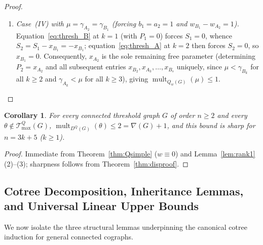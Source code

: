 \documentclass[11pt,a4paper]{article}
\newtheorem{corollary}[theorem]{Corollary}
\theoremstyle{definition}
\DeclareMathOperator{\mult}{mult}
\begin{document}
\begin{proof}
\begin{enumerate}
    \item \emph{Case~(IV) with $\mu = \gamma_{A_2} = \gamma_{B_1}$ (forcing $b_1 = a_2 = 1$ and $w_{B_1} - w_{A_2} = 1$).} Equation~\eqref{eq:thresh_B} at $k=1$ (with $P_1 = 0$) forces $S_1 = 0$, whence $S_2 = S_1 - x_{B_1} = -x_{B_1}$; equation~\eqref{eq:thresh_A} at $k=2$ then forces $S_2 = 0$, so $x_{B_1} = 0$. Consequently, $x_{A_2}$ is the sole remaining free parameter (determining $P_2 = x_{A_2}$ and all subsequent entries $x_{B_2}, x_{A_3}, \dots, x_{B_s}$ uniquely, since $\mu < \gamma_{B_k}$ for all $k \ge 2$ and $\gamma_{A_k} < \mu$ for all $k \ge 3$), giving $\mult_{Q_w(G)}(\mu) \le 1$. \qedhere
  \end{enumerate}
\end{proof}

\begin{corollary}\label{cor:repaired}
  For every connected threshold graph $G$ of order $n \ge 2$ and every $\theta \notin \mathcal{T}^Q_{\max}(G)$, $\mult_{D^Q(G)}(\theta) \le 2 = \nabla(G) + 1$, and this bound is sharp for $n = 3k+5$ ($k \ge 1$).
\end{corollary}

\begin{proof}
  Immediate from Theorem~\ref{thm:Qsimple} ($w \equiv 0$) and Lemma~\ref{lem:rank1}(2)--(3); sharpness follows from Theorem~\ref{thm:disproof}.
\end{proof}

\subsection{Cotree Decomposition, Inheritance Lemmas, and Universal Linear Upper Bounds}

We now isolate the three structural lemmas underpinning the canonical cotree induction for general connected cographs.
\end{document}
